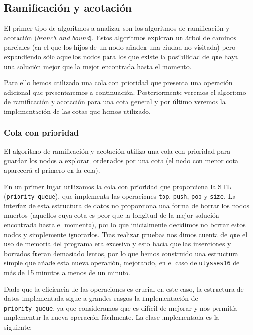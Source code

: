 \subsection{Ramificación y acotación}

El primer tipo de algoritmos a analizar son los algoritmos de ramificación y acotación
(\textit{branch and bound}). Estos algoritmos exploran un árbol de caminos parciales (en el que los hijos de un nodo añaden una ciudad no visitada) pero expandiendo sólo aquellos nodos para los que existe la posibilidad de que haya una solución mejor que la mejor
encontrada hasta el momento.

Para ello hemos utilizado una cola con prioridad que presenta una operación adicional
que presentaremos a continuación. Posteriormente veremos el algoritmo de ramificación
y acotación para una cota general y por último veremos la implementación de las cotas
que hemos utilizado.

\subsubsection{Cola con prioridad}

El algoritmo de ramificación y acotación utiliza una cola con prioridad para guardar
los nodos a explorar, ordenados por una cota (el nodo con menor cota aparecerá el
primero en la cola).

En un primer lugar utilizamos la cola con prioridad que proporciona la STL (\texttt{priority\_queue}), que implementa las operaciones \texttt{top}, \texttt{push}, \texttt{pop} y \texttt{size}. La interfaz de esta estructura de datos no proporciona una forma de borrar los nodos muertos (aquellos cuya cota es peor que la longitud de la mejor solución encontrada hasta el momento), por lo que inicialmente decidimos no borrar estos nodos y simplemente ignorarlos. Tras realizar pruebas nos dimos cuenta de que el
uso de memoria del programa era excesivo y esto hacía que las inserciones y borrados fueran demasiado lentos, por lo que hemos construido una estructura simple que añade esta nueva operación, mejorando, en el caso de \texttt{ulysses16} de más de 15 minutos a menos de un minuto.

Dado que la eficiencia de las operaciones es crucial en este caso, la estructura de datos implementada sigue a grandes rasgos la implementación de \texttt{priority\_queue}, ya que consideramos que es difícil de mejorar y nos permitía implementar la nueva operación fácilmente. La clase implementada es la siguiente:

